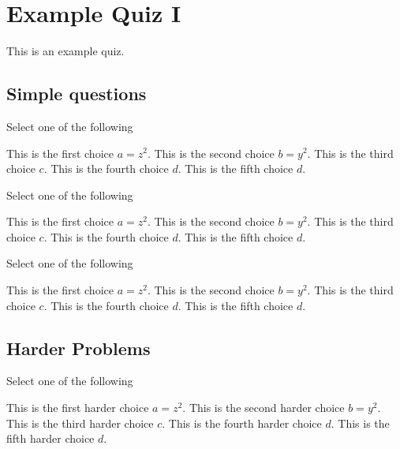 \chapter{Example Quiz I}
\label{XXch:sets}

\begin{preamble}
This is an example quiz.
\end{preamble}


\section{Simple questions}
\label{XXsec:sets::math}


\begin{problem}[Choices I]
Select one of the following
\begin{choices}
\choice This is the first choice $a = z^2$.
\choice This is the second choice $b = y^2$.
\correctchoice This is the third choice $c$.
\correctchoice This is the fourth choice $d$.
\choice This is the fifth choice $d$.
\end{choices}
\end{problem}


\begin{problem}[Choices II]
Select one of the following
\begin{choices}[20]
\choice This is the first choice $a = z^2$.
\choice This is the second choice $b = y^2$.
\correctchoice This is the third choice $c$.
\correctchoice This is the fourth choice $d$.
\choice This is the fifth choice $d$.
\end{choices}
\end{problem}

\begin{problem}
Select one of the following
\begin{choices}[30]
\choice This is the first choice $a = z^2$.
\choice This is the second choice $b = y^2$.
\correctchoice This is the third choice $c$.
\correctchoice This is the fourth choice $d$.
\choice This is the fifth choice $d$.
\end{choices}
\end{problem}


\section{Harder Problems}

\begin{problem}
Select one of the following
\begin{choices}[40]
\choice This is the first harder choice $a = z^2$.
\choice This is the second harder choice $b = y^2$.
\correctchoice This is the third harder choice $c$.
\correctchoice This is the fourth harder choice $d$.
\choice This is the fifth harder choice $d$.
\end{choices}
\end{problem}


